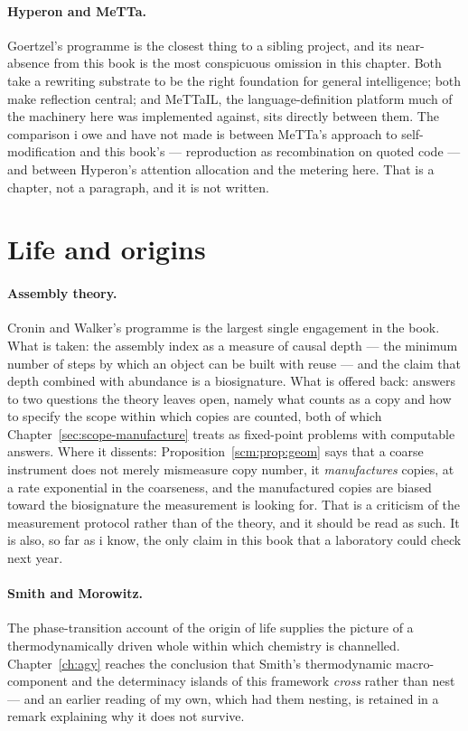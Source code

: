 \paragraph{Hyperon and MeTTa.}
Goertzel's programme \cite{goertzel2021} is the closest thing to a
sibling project, and its near-absence from this book is the most
conspicuous omission in this chapter.
Both take a rewriting substrate to be the right foundation for
general intelligence; both make reflection central; and MeTTaIL,
the language-definition platform much of the machinery here was
implemented against, sits directly between them.
The comparison i owe and have not made is between MeTTa's
approach to self-modification and this book's --- reproduction as
recombination on quoted code --- and between Hyperon's
attention allocation and the metering here.
That is a chapter, not a paragraph, and it is not written.

\section*{Life and origins}

\paragraph{Assembly theory.}
Cronin and Walker's programme \cite{cronin2021,walker2023} is the
largest single engagement in the book.
What is taken: the assembly index as a measure of causal depth ---
the minimum number of steps by which an object can be built with
reuse --- and the claim that depth combined with abundance is a
biosignature.
What is offered back: answers to two questions the theory leaves
open, namely what counts as a copy and how to specify the scope
within which copies are counted, both of which
Chapter~\ref{sec:scope-manufacture} treats as fixed-point problems
with computable answers.
Where it dissents: Proposition~\ref{scm:prop:geom} says that a
coarse instrument does not merely mismeasure copy number, it
\emph{manufactures} copies, at a rate exponential in the coarseness,
and the manufactured copies are biased toward the biosignature the
measurement is looking for.
That is a criticism of the measurement protocol rather than of the
theory, and it should be read as such.
It is also, so far as i know, the only claim in this book that a
laboratory could check next year.

\paragraph{Smith and Morowitz.}
The phase-transition account of the origin of life
\cite{SmithMorowitz} supplies the picture of a thermodynamically
driven whole within which chemistry is channelled.
Chapter~\ref{ch:agy} reaches the conclusion that Smith's
thermodynamic macro-component and the determinacy islands of this
framework \emph{cross} rather than nest --- and an earlier reading
of my own, which had them nesting, is retained in a remark
explaining why it does not survive.

